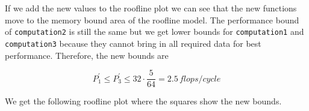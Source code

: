 \documentclass[a4paper]{article}
\begin{document}
\begin{enumerate}
\begin{enumerate}
                If we add the new values to the roofline plot we can see that
                the new functions move to the memory bound area of the roofline
                model. The performance bound of \verb|computation2| is still the
                same but we get lower bounds for \verb|computation1| and
                \verb|computation3| because they cannot bring in all required
                data for best performance. Therefore, the new bounds are

                \begin{equation*}
                    P^\prime_1 \leq P^\prime_3 \leq 32 \cdot
                    \frac{5}{64} = 2.5 \, flops/cycle
                \end{equation*}

                We get the following roofline plot where the squares show the
                new bounds. 

                \begin{center}
\end{center}
\end{enumerate}
\end{enumerate}
\end{document}
